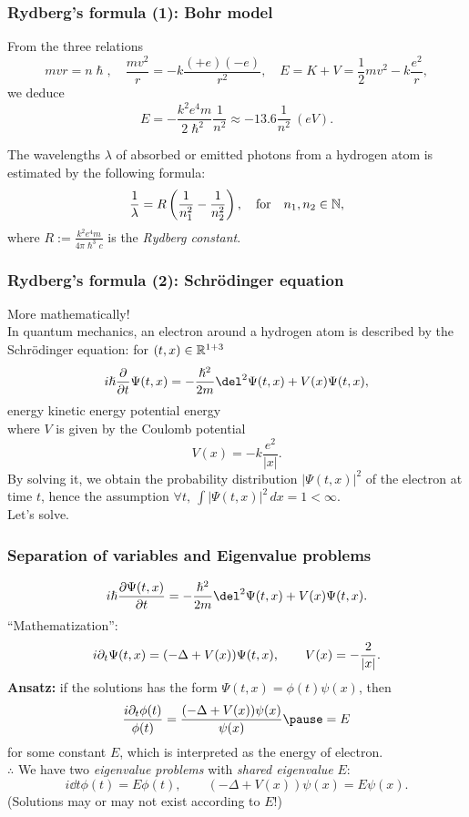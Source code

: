 \documentclass[10pt,handout]{beamer}
\begin{document}
\begin{frame}
\frametitle{Rydberg's formula (1): Bohr model}
  From the three relations
  \[mvr=n\hslash,\quad\frac{mv^2}r=-k\frac{(+e)(-e)}{r^2},\quad E=K+V=\frac12mv^2-k\frac{e^2}r,\]
  \pause we deduce
  \[E=-\frac{k^2e^4m}{2\hslash^2}\frac1{n^2}\approx-13.6\frac1{n^2}\ (eV).\]
  \pause
  \begin{prop}
    The wavelengths $\lambda$ of absorbed or emitted photons from a hydrogen atom is estimated by the following formula:
    \[\frac1\lambda=R\left(\frac1{n_1^2}-\frac1{n_2^2}\right),\quad\text{for}\quad n_1,n_2\in\mathbb{N},\]
    where $R:=\frac{k^2e^4m}{4\pi\hslash^3c}$ is the \emph{Rydberg constant}.
  \end{prop}
\end{frame}

\begin{frame}
\frametitle{Rydberg's formula (2): Schr\"odinger equation}
  More mathematically!\\
  \pause In quantum mechanics, an electron around a hydrogen atom is described by the Schr\"odinger equation: for $(t,x)\in\mathbb{R}^{1+3}$
  \[i\hslash\pd{t}\Psi(t,x)=-\frac{\hslash^2}{2m}\del^2\Psi(t,x)+V(x)\Psi(t,x),\]
  \pause \hspace{6em} energy \hspace{2em} kinetic energy \hspace{1em} potential energy\\
  \bigskip
  \pause where $V$ is given by the Coulomb potential
  \[V(x)=-k\frac{e^2}{|x|}.\]
  \pause By solving it, we obtain the probability distribution $|\Psi(t,x)|^2$ of the electron at time $t$, hence the assumption $\forall t,\ \int|\Psi(t,x)|^2\,dx=1<\infty$.\\
  \pause Let's solve.
\end{frame}

\begin{frame}
\frametitle{Separation of variables and Eigenvalue problems}
  \[i\hslash\pd{\Psi(t,x)}{t}=-\frac{\hslash^2}{2m}\del^2\Psi(t,x)+V(x)\Psi(t,x).\]
  \pause ``Mathematization'':
  \[i\pd_t\Psi(t,x)=(-\Delta+V(x))\Psi(t,x),\qquad V(x)=-\frac2{|x|}.\]
  \pause \textbf{Ansatz:} if the solutions has the form $\Psi(t,x)=\phi(t)\psi(x)$, \pause then
  \[\frac{i\pd_t\phi(t)}{\phi(t)}=\frac{(-\Delta+V(x))\psi(x)}{\psi(x)}\pause=E\]
  for some constant $E$, which is interpreted as the energy of electron.\\
  \pause $\therefore$ We have two \emph{eigenvalue problems} with \emph{shared eigenvalue} $E$:
  \[i\dd{t}\phi(t)=E\phi(t),\qquad(-\Delta+V(x))\psi(x)=E\psi(x).\]
  (Solutions may or may not exist according to $E$!)
\end{frame}
\end{document}
